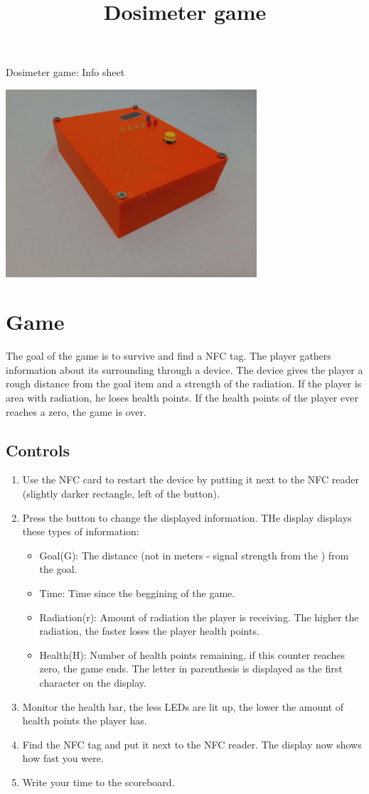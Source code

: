 \documentclass{article}
\title{Dosimeter game}
\begin{document}
\vspace*{10px}
{\huge{Dosimeter game: Info sheet}}


\begin{center}
    \centering
    \includegraphics[width=0.7\textwidth]{imgs/Box2.jpg}
\end{center}

\section{Game}
The goal of the game is to survive and find a NFC tag. 
The player gathers information about its surrounding through a device.
The device gives the player a rough distance from the goal item and a strength of the radiation.
If the player is area with radiation, he loses health points.
If the health points of the player ever reaches a zero, the game is over.

\subsection{Controls}
\begin{enumerate}
\item Use the NFC card to restart the device by putting it next to the NFC reader (slightly darker rectangle, left of the button).
\item Press the button to change the displayed information. THe display displays these types of information:
\begin{itemize}
\item Goal(G): The distance (not in meters - signal strength from the ) from the goal.
\item Time: Time since the beggining of the game.
\item Radiation(r): Amount of radiation the player is receiving. The higher the radiation, the faster loses the player health points. 
\item Health(H): Number of health points remaining, if this counter reaches zero, the game ends.
The letter in parenthesis is displayed as the first character on the display.
\end{itemize}
\item Monitor the health bar, the less LEDs are lit up, the lower the amount of health points the player has.
\item Find the NFC tag and put it next to the NFC reader. The display now shows how fast you were.
\item Write your time to the scoreboard.
\end{enumerate}
\end{document}
